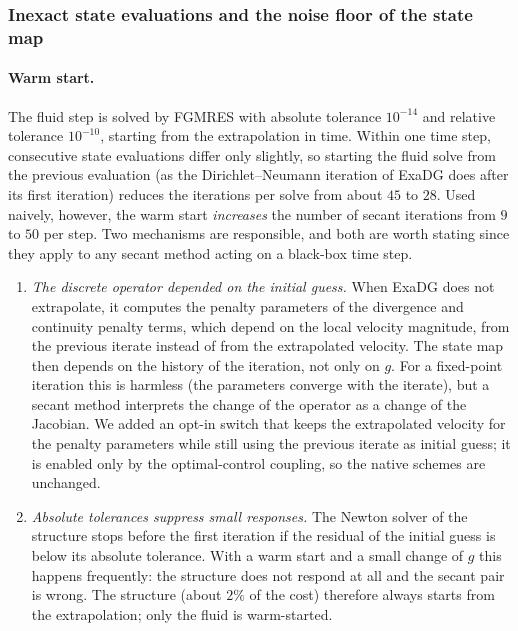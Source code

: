 \documentclass[11pt,a4paper]{article}
\theoremstyle{definition}
\theoremstyle{remark}
\begin{document}
\subsubsection{Inexact state evaluations and the noise floor of the state map}\label{sec:inexact}

\paragraph{Warm start.} The fluid step is solved by FGMRES with absolute tolerance $10^{-14}$ and
relative tolerance $10^{-10}$, starting from the extrapolation in time. Within one time step,
consecutive state evaluations differ only slightly, so starting the fluid solve from the previous
evaluation (as the Dirichlet--Neumann iteration of ExaDG does after its first iteration) reduces
the iterations per solve from about $45$ to $28$. Used naively, however, the warm start
\emph{increases} the number of secant iterations from $9$ to $50$ per step. Two mechanisms are
responsible, and both are worth stating since they apply to any secant method acting on a
black-box time step.

\begin{enumerate}
\item \emph{The discrete operator depended on the initial guess.} When ExaDG does not extrapolate,
it computes the penalty parameters of the divergence and continuity penalty terms, which depend on
the local velocity magnitude, from the previous iterate instead of from the extrapolated velocity.
The state map then depends on the history of the iteration, not only on $g$. For a fixed-point
iteration this is harmless (the parameters converge with the iterate), but a secant method
interprets the change of the operator as a change of the Jacobian. We added an opt-in switch
 that keeps the extrapolated velocity
for the penalty parameters while still using the previous iterate as initial guess; it is enabled
only by the optimal-control coupling, so the native schemes are unchanged.
\item \emph{Absolute tolerances suppress small responses.} The Newton solver of the structure
stops before the first iteration if the residual of the initial guess is below its absolute
tolerance. With a warm start and a small change of $g$ this happens frequently: the structure does
not respond at all and the secant pair is wrong. The structure (about $2\%$ of the cost) therefore
always starts from the extrapolation; only the fluid is warm-started.
\end{enumerate}
\end{document}
